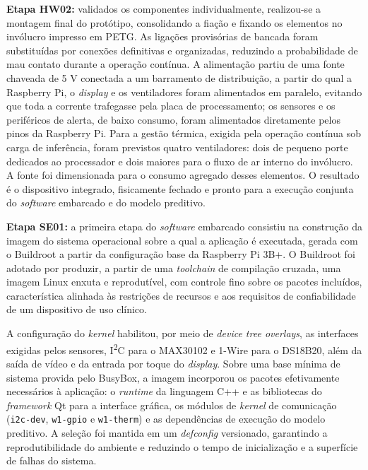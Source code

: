 \textbf{Etapa HW02:} validados os componentes individualmente, realizou-se a montagem final do protótipo, consolidando a fiação e fixando os elementos no invólucro impresso em PETG. As ligações provisórias de bancada foram substituídas por conexões definitivas e organizadas, reduzindo a probabilidade de mau contato durante a operação contínua. A alimentação partiu de uma fonte chaveada de 5 V conectada a um barramento de distribuição, a partir do qual a Raspberry Pi, o \textit{display} e os ventiladores foram alimentados em paralelo, evitando que toda a corrente trafegasse pela placa de processamento; os sensores e os periféricos de alerta, de baixo consumo, foram alimentados diretamente pelos pinos da Raspberry Pi. Para a gestão térmica, exigida pela operação contínua sob carga de inferência, foram previstos quatro ventiladores: dois de pequeno porte dedicados ao processador e dois maiores para o fluxo de ar interno do invólucro. A fonte foi dimensionada para o consumo agregado desses elementos. O resultado é o dispositivo integrado, fisicamente fechado e pronto para a execução conjunta do \textit{software} embarcado e do modelo preditivo.

\textbf{Etapa SE01:} a primeira etapa do \textit{software} embarcado consistiu na construção da imagem do sistema operacional sobre a qual a aplicação é executada, gerada com o Buildroot a partir da configuração base da Raspberry Pi 3B+. O Buildroot foi adotado por produzir, a partir de uma \textit{toolchain} de compilação cruzada, uma imagem Linux enxuta e reprodutível, com controle fino sobre os pacotes incluídos, característica alinhada às restrições de recursos e aos requisitos de confiabilidade de um dispositivo de uso clínico.

A configuração do \textit{kernel} habilitou, por meio de \textit{device tree overlays}, as interfaces exigidas pelos sensores, I\textsuperscript{2}C para o MAX30102 e 1-Wire para o DS18B20, além da saída de vídeo e da entrada por toque do \textit{display}. Sobre uma base mínima de sistema provida pelo BusyBox, a imagem incorporou os pacotes efetivamente necessários à aplicação: o \textit{runtime} da linguagem C++ e as bibliotecas do \textit{framework} Qt para a interface gráfica, os módulos de \textit{kernel} de comunicação (\texttt{i2c-dev}, \texttt{w1-gpio} e \texttt{w1-therm}) e as dependências de execução do modelo preditivo. A seleção foi mantida em um \textit{defconfig} versionado, garantindo a reprodutibilidade do ambiente e reduzindo o tempo de inicialização e a superfície de falhas do sistema.

